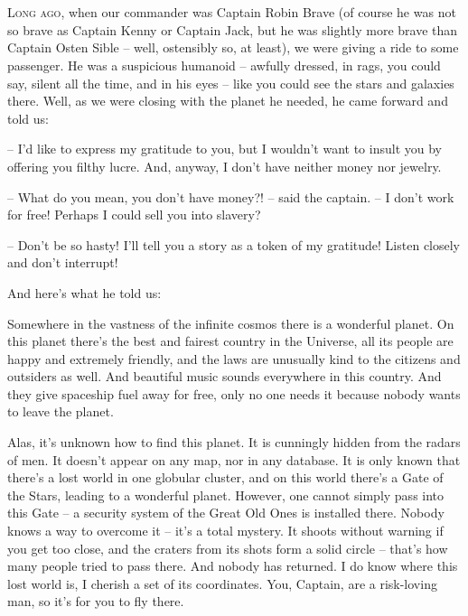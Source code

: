 \documentclass[ebook,twoside,final,openright]{memoir}
\begin{document}
\chapter{}
\par
\lettrine{L}{ong ago,} when our commander was Captain Robin Brave (of course he was not so brave as Captain Kenny or Captain Jack, but he was slightly more brave than Captain Osten Sible – well, ostensibly so, at least), we were giving a ride to some passenger. He was a suspicious humanoid – awfully dressed, in rags, you could say, silent all the time, and in his eyes – like you could see the stars and galaxies there. Well, as we were closing with the planet he needed, he came forward and told us: \par
\par
– I'd like to express my gratitude to you, but I wouldn’t want to insult you by offering you filthy lucre. And, anyway, I don’t have neither money nor jewelry.\par
– What do you mean, you don’t have money?! – said the captain. – I don’t work for free! Perhaps I could sell you into slavery? \par
– Don’t be so hasty! I'll tell you a story as a token of my gratitude! Listen closely and don’t interrupt! \par
 And here’s what he told us:\par
\par
Somewhere in the vastness of the infinite cosmos there is a wonderful planet. On this planet there’s the best and fairest country in the Universe, all its people are happy and extremely friendly, and the laws are unusually kind to the citizens and outsiders as well. And beautiful music sounds everywhere in this country. And they give spaceship fuel away for free, only no one needs it because nobody wants to leave the planet. \par
Alas, it’s unknown how to find this planet. It is cunningly hidden from the radars of men. It doesn’t appear on any map, nor in any database. It is only known that there’s a lost world in one globular cluster, and on this world there’s a Gate of the Stars, leading to a wonderful planet. However, one cannot simply pass into this Gate – a security system of the Great Old Ones is installed there. Nobody knows a way to overcome it – it’s a total mystery. It shoots without warning if you get too close, and the craters from its shots form a solid circle – that's how many people tried to pass there. And nobody has returned. I do know where this lost world is, I cherish a set of its coordinates. You, Captain, are a risk-loving man, so it’s for you to fly there.\par
\end{document}
